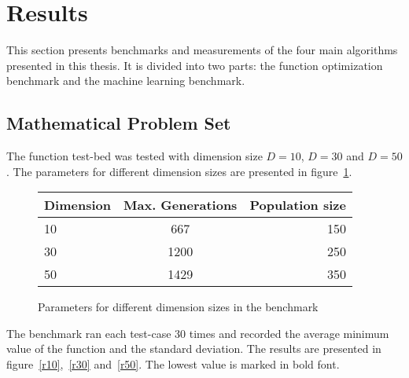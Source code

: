 \section{Results}

This section presents benchmarks and measurements of the four main algorithms presented in this thesis. It is divided into two parts: the function optimization benchmark and the machine learning benchmark.

\subsection{Mathematical Problem Set}

The function test-bed was tested with dimension size $D=10$, $D=30$ and $D=50$. The parameters for different dimension sizes are presented in figure~\ref{t1}.

\begin{figure}[H]
  \centering
  \begin{center}
    \begin{tabular}{ | l | c | r | }
      \hline
      Dimension & Max. Generations & Population size \\ \hline
      10 & 667 & 150 \\ \hline
      30 & 1200 & 250 \\ \hline
      50 & 1429 & 350 \\
      \hline
    \end{tabular}
  \end{center}
  \caption{Parameters for different dimension sizes in the benchmark}
  \label{t1}
\end{figure}

The benchmark ran each test-case 30 times and recorded the average minimum value of the function and the standard deviation. The results are presented in figure~\ref{r10},~\ref{r30} and~\ref{r50}. The lowest value is marked in bold font.




